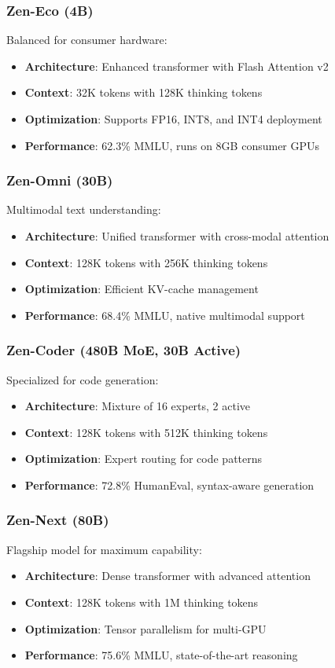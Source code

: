 \documentclass[11pt,a4paper]{article}
\begin{document}
\subsubsection{Zen-Eco (4B)}
Balanced for consumer hardware:
\begin{itemize}
    \item \textbf{Architecture}: Enhanced transformer with Flash Attention v2
    \item \textbf{Context}: 32K tokens with 128K thinking tokens
    \item \textbf{Optimization}: Supports FP16, INT8, and INT4 deployment
    \item \textbf{Performance}: 62.3\% MMLU, runs on 8GB consumer GPUs
\end{itemize}

\subsubsection{Zen-Omni (30B)}
Multimodal text understanding:
\begin{itemize}
    \item \textbf{Architecture}: Unified transformer with cross-modal attention
    \item \textbf{Context}: 128K tokens with 256K thinking tokens
    \item \textbf{Optimization}: Efficient KV-cache management
    \item \textbf{Performance}: 68.4\% MMLU, native multimodal support
\end{itemize}

\subsubsection{Zen-Coder (480B MoE, 30B Active)}
Specialized for code generation:
\begin{itemize}
    \item \textbf{Architecture}: Mixture of 16 experts, 2 active
    \item \textbf{Context}: 128K tokens with 512K thinking tokens
    \item \textbf{Optimization}: Expert routing for code patterns
    \item \textbf{Performance}: 72.8\% HumanEval, syntax-aware generation
\end{itemize}

\subsubsection{Zen-Next (80B)}
Flagship model for maximum capability:
\begin{itemize}
    \item \textbf{Architecture}: Dense transformer with advanced attention
    \item \textbf{Context}: 128K tokens with 1M thinking tokens
    \item \textbf{Optimization}: Tensor parallelism for multi-GPU
    \item \textbf{Performance}: 75.6\% MMLU, state-of-the-art reasoning
\end{itemize}
\end{document}
